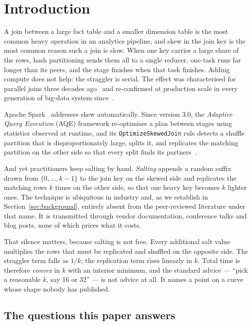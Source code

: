 \section{Introduction}

A join between a large fact table and a smaller dimension table is the most
common heavy operation in an analytics pipeline, and skew in the join key is
the most common reason such a join is slow. When one key carries a large share
of the rows, hash partitioning sends them all to a single reducer, one task
runs far longer than its peers, and the stage finishes when that task finishes.
Adding compute does not help: the straggler is serial. The effect was
characterised for parallel joins three decades ago~\cite{walton1991taxonomy,
dewitt1992skew} and re-confirmed at production scale in every generation of
big-data system since~\cite{chaiken2008scope, ananthanarayanan2010mantri,
kwon2012skewtune}.

Apache Spark~\cite{zaharia2012rdd, armbrust2015sparksql} addresses skew
automatically. Since version 3.0, the \emph{Adaptive Query Execution} (AQE)
framework re-optimises a plan between stages using statistics observed at
runtime, and its \texttt{OptimizeSkewedJoin} rule detects a shuffle partition
that is disproportionately large, splits it, and replicates the matching
partition on the other side so that every split finds its
partners~\cite{databricks_aqe, spark_aqe_docs, xue2024adaptive}.

And yet practitioners keep salting by hand. \emph{Salting} appends a random
suffix drawn from $\{0,\dots,k-1\}$ to the join key on the skewed side and
replicates the matching rows $k$ times on the other side, so that one heavy key
becomes $k$ lighter ones. The technique is ubiquitous in industry and, as we
establish in Section~\ref{sec:background}, entirely absent from the
peer-reviewed literature under that name. It is transmitted through vendor
documentation, conference talks and blog posts, none of which prices what it
costs.

That silence matters, because salting is not free. Every additional salt value
multiplies the rows that must be replicated and shuffled on the opposite side.
The straggler term falls as $1/k$; the replication term rises linearly in $k$.
Total time is therefore \emph{convex} in $k$ with an interior minimum, and the
standard advice --- ``pick a reasonable $k$, say 16 or 32'' --- is not advice at
all. It names a point on a curve whose shape nobody has published.

\subsection{The questions this paper answers}

